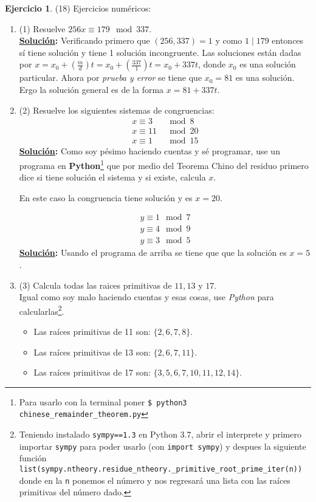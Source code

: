 \documentclass[11pt,letterpaper]{article}
\theoremstyle{definition}\newtheorem{p}{Ejercicio}
\newcommand{\sol}{\textbf{\underline{Solución}: }} %
\begin{document}
\begin{p}(18)
Ejercicios num\'ericos:
\begin{enumerate}
  \item(1) Resuelve $256x\equiv 179\mod 337$.\\
  \sol Verificando primero que $(256, 337)=1$ y como $1 \mid 179$ entonces sí tiene solución y tiene
  1 solución incongruente. Las soluciones están dadas por 
  $x = x_0 + (\frac{m}{d})t = x_0 + (\frac{337}{1})t = x_0 + 337t$, donde $x_0$ es una solución
  particular. Ahora por \textit{prueba y error} se tiene que $x_0 = 81$ es una solución.\\
  Ergo la solución general es de la forma $x = 81 + 337t$.

  \item(2) Resuelve los siguientes sistemas de congruencias:
  \begin{align*}
    x\equiv 3&\mod 8\\
    x\equiv 11&\mod 20\\
    x\equiv 1&\mod 15
  \end{align*}
  \sol Como soy pésimo haciendo cuentas y sé programar, use un programa en 
  \textbf{Python}\footnote{Para usarlo con la terminal poner \texttt{\$ python3 chinese\_remainder\_theorem.py}} que
  por medio del Teorema Chino del residuo primero dice si tiene solución el sistema y si existe, calcula $x$.
  

  En este caso la congruencia tiene solución y es $x=20$.

  \begin{align*}
    y\equiv1\mod7\\
    y\equiv4\mod 9\\
    y\equiv 3\mod 5
  \end{align*}
  \sol Usando el programa de arriba se tiene que que la solución es $x=5$.

  \item(3) Calcula todas las raices primitivas de $11,13$ y $17$.\\
  Igual como soy malo haciendo cuentas y esas cosas, use \textit{Python} para 
  calcularlas\footnote{Teniendo instalado \texttt{sympy==1.3} en Python 3.7, abrir el interprete
  y primero importar \texttt{sympy} para poder usarlo (con \texttt{import sympy}) y despues la
  siguiente función \texttt{list(sympy.ntheory.residue\_ntheory.\_primitive\_root\_prime\_iter(n))}
  donde en la \texttt{n} ponemos el número y nos regresará una lista con las raíces primitivas
  del número dado.}.
  \begin{itemize}
    \item Las raíces primitivas de 11 son: $\{ 2,6,7,8\}$.
    \item Las raíces primitivas de 13 son: $\{ 2,6,7,11\}$.
    \item Las raíces primitivas de 17 son: $\{ 3,5,6,7,10,11,12,14\}$.
  \end{itemize}


\end{enumerate}
\end{p}
\end{document}
